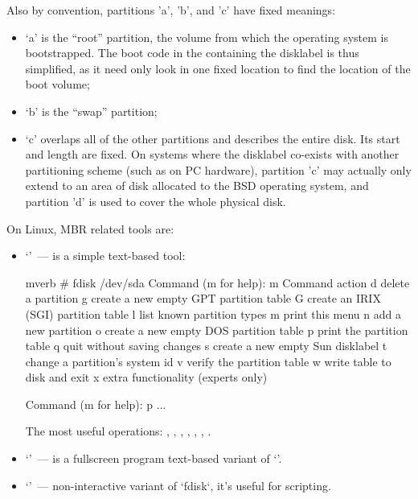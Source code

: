 Also by convention, partitions 'a', 'b', and 'c' have fixed meanings:
\begin{itemize}
\item `a' is the ``root'' partition, the volume from which the operating system
      is bootstrapped. The boot code in the 
      containing the disklabel is thus simplified, as it need only look in one
      fixed location to find the location of the boot volume;
\item `b' is the ``swap'' partition;
\item `c' overlaps all of the other partitions and describes the entire disk.
      Its start and length are fixed. On systems where the disklabel co-exists
      with another partitioning scheme (such as on PC hardware), partition 'c'
      may actually only extend to an area of disk allocated to the BSD operating
      system, and partition 'd' is used to cover the whole physical disk.
\end{itemize}

On Linux, MBR related tools are:
\begin{itemize}
\item `'~--- is a simple text-based tool:
\begin{code}{mverb}
# fdisk /dev/sda
Command (m for help): m
Command action
   d   delete a partition
   g   create a new empty GPT partition table
   G   create an IRIX (SGI) partition table
   l   list known partition types
   m   print this menu
   n   add a new partition
   o   create a new empty DOS partition table
   p   print the partition table
   q   quit without saving changes
   s   create a new empty Sun disklabel
   t   change a partition's system id
   v   verify the partition table
   w   write table to disk and exit
   x   extra functionality (experts only)

Command (m for help): p
...
\end{code}
The most useful operations: , , , , , , .
\item `'~--- is a fullscreen program text-based variant of `'.
\item `'~--- non-interactive variant of `fdisk`, it's useful
      for scripting.
\end{itemize}

